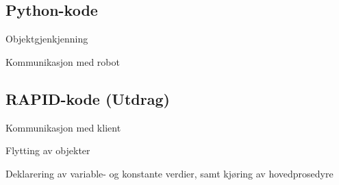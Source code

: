 \subsection{Python-kode}
Objektgjenkjenning

Kommunikasjon med robot


\subsection{RAPID-kode (Utdrag)}
Kommunikasjon med klient

Flytting av objekter

Deklarering av variable- og konstante verdier, samt kjøring av hovedprosedyre
